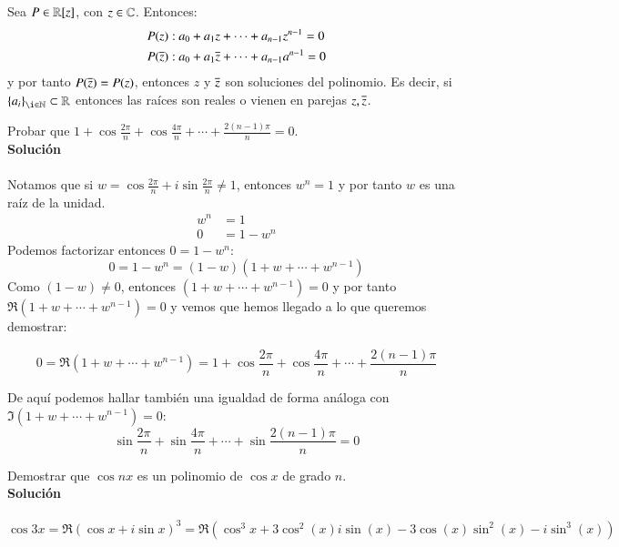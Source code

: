     \begin{eg}
        Sea $P \in \mathbb{R}[z]$, con $z \in \mathbb{C}$. Entonces:
        \begin{align*}
            P(z):&\ a_0 + a_1z + \cdots + a_{n-1}z^{n-1} = 0\\
            P(\overline{z}):&\ a_0 + a_1\overline{z} + \cdots + a_{n-1}a^{n-1} = 0
        \end{align*}
        y por tanto $P(\overline{z}) = P(z)$, entonces $z$ y $\overline{z}$ son soluciones del polinomio. Es decir, si $\sdf{a_i}_{\i \in \N} \subset \R$ entonces las raíces son reales o vienen en parejas $z, \overline{z}$.
    \end{eg}

    \begin{th_ex}
        Probar que $1 + \cos \frac{2\pi}{n} + \cos \frac{4\pi}{n} + \cdots + \frac{2(n-1)\pi}{n} = 0$.\\

        \textbf{Solución}\\\\
        Notamos que si $w = \cos \frac{2\pi}{n} + i\sin \frac{2\pi}{n} \neq 1$, entonces $w^n = 1$ y por tanto $w$ es una raíz de la unidad.
        \begin{align*}
            w^n &= 1\\
            0 &= 1 - w^n
        \end{align*}
        Podemos factorizar entonces $0 = 1-w^n$:
        $$
            0 = 1-w^n = (1-w)(1+w+\cdots+w^{n-1})
        $$
        Como $(1-w) \neq 0$, entonces $(1+w+\cdots+w^{n-1}) = 0$ y por tanto $\Re(1+w+\cdots+w^{n-1}) = 0$ y vemos que hemos llegado a lo que queremos demostrar:

        $$
            0  =\Re(1+w+\cdots+w^{n-1}) = 1 + \cos \frac{2\pi}{n} + \cos \frac{4\pi}{n} + \cdots + \frac{2(n-1)\pi}{n}
        $$

        De aquí podemos hallar también una igualdad de forma análoga con $\Im(1+w+\cdots+w^{n-1})=0$:
        $$
            \sin \frac{2\pi}{n} + \sin \frac{4\pi}{n} + \cdots + \sin \frac{2(n-1)\pi}{n} = 0
        $$
    \end{th_ex}

    \begin{th_ex}
        Demostrar que $\cos nx$ es un polinomio de $\cos x$ de grado $n$.\\

        \textbf{Solución}\\\\
        $$
            \cos 3x = \Re(\cos x + i\sin x)^3 = \Re(\cos^3 x + 3 \cos^2(x) i \sin(x) - 3 \cos(x)\sin^2(x) - i\sin^3(x))
        $$
    \end{th_ex}

